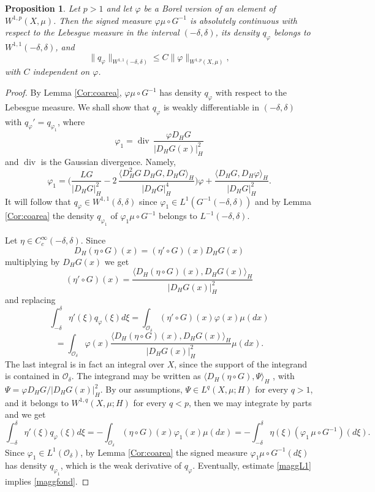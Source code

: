 \documentclass[reqno,twoside,12pt]{amsart}
\newtheorem{Proposition}[Theorem]{Proposition}
\begin{document}
\begin{Proposition}
\label{W11}
Let $p>1$ and let $\varphi$ be a Borel version of an element of $W^{1,p}(X, \mu)$. Then  the signed measure $\varphi \mu\circ G^{-1}$ is absolutely continuous with respect to the Lebesgue measure in the interval $(-\delta, \delta)$,  its  density $q_{\varphi}$ belongs to 
$W^{1,1}(-\delta, \delta)$, and  
\begin{equation}
\label{maggfond} \|q_{\varphi}\|_{W^{1,1}(-\delta, \delta)} \leq C \|\varphi\|_{W^{1,p}(X, \mu)}, 
\end{equation}
with $C$ independent on $\varphi$. 
\end{Proposition}
\begin{proof}
By Lemma \ref{Cor:coarea}, $\varphi \mu\circ G^{-1}$ has density $q_{\varphi}$ with respect to the Lebesgue measure.
We shall show that  $q_{\varphi}$ is weakly differentiable  in  $(-\delta, \delta)$ with $q_{\varphi}' = q_{\varphi_1}$, where
$$\varphi_1 = {\operatorname{div}} \,\frac{\varphi  D_HG}{|D_HG(x) |^2_H} $$
and ${\operatorname{div}}$ is the Gaussian divergence. Namely, 
$$\varphi_1 =  \bigg(   \frac{LG }{|D_HG |_H^2}  - 2\,\frac{\langle  D^2_HG \,D_HG, D_HG\rangle_H}{ |D_HG |_H^4}\bigg) \varphi  + \frac{\langle D_HG,  D_H\varphi\rangle_H}{ |D_HG |_H^2} .$$
It will follow that  $q_{\varphi}\in W^{1,1}(\delta, \delta)$ since  $\varphi_1  \in L^1(G^{-1}(-\delta, \delta))$ and by Lemma \ref{Cor:coarea} the density  $q_{\varphi_1}$ of
$\varphi_1\mu \circ G^{-1}$ belongs to  $L^{-1}(-\delta, \delta)$. 

Let  $\eta\in C^{\infty}_{c}(-\delta, \delta)$. Since 
$$ D_H ( \eta\circ G) (x)   = ( \eta' \circ G)(x)D_HG(x) $$
multiplying by  $D_HG(x) $ we get
$$ ( \eta' \circ G)(x) = \frac{  \langle D_H ( \eta\circ G) (x) , D_HG(x)\rangle_H }{|D_HG(x) |^2_H}$$
and replacing
$$\int_{-\delta}^{\delta}\eta'(\xi) q_{\varphi}(\xi)d\xi = \int_{{\mathcal O}_{\delta}} ( \eta' \circ G)(x) 
\varphi(x) \mu(dx) $$
$$= \int_{{\mathcal O}_{\delta}}   \varphi(x) \frac{  \langle D_H ( \eta\circ G) (x) , D_HG(x)\rangle _H}{|D_HG(x) |^2_H}\mu(dx) .$$
The last integral is in fact an integral over $X$, since the support of the integrand is contained in   ${\mathcal O}_{\delta}$. The integrand may be written as  $ \langle D_H ( \eta\circ G), \Psi\rangle_H$ , with  $\Psi = \varphi  D_HG/ |D_HG(x) |^2_H$. By our assumptions,    $\Psi \in L^q(X, \mu; H)$ for every $q>1$, and it belongs to 
$W^{1,q}(X, \mu; H)$ for every  $q<p$, then we may integrate by parts and we get 
$$ \int_{-\delta}^{\delta}\eta'(\xi) q_{\varphi}(\xi)d\xi = - \int_{{\mathcal O}_{\delta}}   ( \eta \circ 
G)(x) \varphi_1(x) \mu(dx) =
  - \int_{-\delta}^{\delta} \eta(\xi) (\varphi_1\,\mu\circ G^{-1})(d\xi).$$
Since  $\varphi_1\in L^1({\mathcal O}_{\delta})$, by Lemma  \ref{Cor:coarea}  the signed measure $\varphi_1\mu\circ G^{-1}(d\xi)$ has density
$q_{\varphi_1}$, which is the weak derivative of $q_{\varphi}$. Eventually, estimate  \eqref{maggL1} implies \eqref{maggfond}. 
\end{proof}
\end{document}

